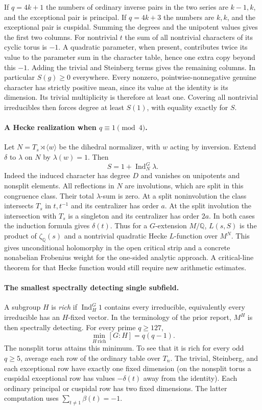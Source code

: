 If $q=4k+1$ the numbers of ordinary inverse pairs in the two series are $k-1,k$, and the exceptional pair is principal. If $q=4k+3$ the numbers are $k,k$, and the exceptional pair is cuspidal. Summing the degrees and the unipotent values gives the first two columns. For nontrivial $t$ the sum of all nontrivial characters of its cyclic torus is $-1$. A quadratic parameter, when present, contributes twice its value to the parameter sum in the character table, hence one extra copy beyond this $-1$. Adding the trivial and Steinberg terms gives the remaining columns. In particular $S(g)\ge0$ everywhere. Every nonzero, pointwise-nonnegative genuine character has strictly positive mean, since its value at the identity is its dimension. Its trivial multiplicity is therefore at least one. Covering all nontrivial irreducibles then forces degree at least $S(1)$, with equality exactly for $S$.

\paragraph{A Hecke realization when $q\equiv1\pmod4$.}
Let $N=T_s\rtimes\langle w\rangle$ be the dihedral normalizer, with $w$ acting by inversion. Extend $\delta$ to $\lambda$ on $N$ by $\lambda(w)=1$. Then
\[
 S=1+\operatorname{Ind}_N^G\lambda .
\]
Indeed the induced character has degree $D$ and vanishes on unipotents and nonsplit elements. All reflections in $N$ are involutions, which are split in this congruence class. Their total $\lambda$-sum is zero. At a split noninvolution the class intersects $T_s$ in $t,t^{-1}$ and its centralizer has order $a$. At the split involution the intersection with $T_s$ is a singleton and its centralizer has order $2a$. In both cases the induction formula gives $\delta(t)$. Thus for a $G$-extension $M/\mathbb Q$, $L(s,S)$ is the product of $\zeta_{\mathbb Q}(s)$ and a nontrivial quadratic Hecke $L$-function over $M^N$. This gives unconditional holomorphy in the open critical strip and a concrete nonabelian Frobenius weight for the one-sided analytic approach. A critical-line theorem for that Hecke function would still require new arithmetic estimates.

\paragraph{The smallest spectrally detecting single subfield.}
A subgroup $H$ is \emph{rich} if $\operatorname{Ind}_H^G1$ contains every irreducible, equivalently every irreducible has an $H$-fixed vector. In the terminology of the prior report, $M^H$ is then spectrally detecting. For every prime $q\ge127$,
\[
 \min_{H\ \mathrm{rich}} [G:H]=q(q-1).
\]
The nonsplit torus attains this minimum. To see that it is rich for every odd $q\ge5$, average each row of the ordinary table over $T_n$. The trivial, Steinberg, and each exceptional row have exactly one fixed dimension (on the nonsplit torus a cuspidal exceptional row has values $-\delta(t)$ away from the identity). Each ordinary principal or cuspidal row has two fixed dimensions. The latter computation uses $\sum_{t\ne1}\beta(t)=-1$.

